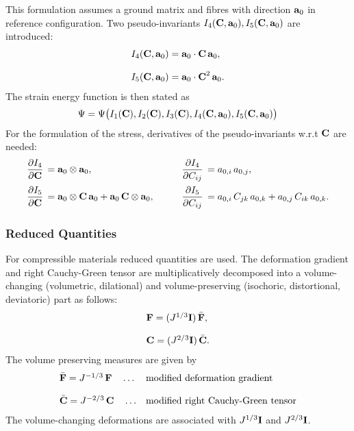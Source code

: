 This formulation assumes a ground matrix and fibres with direction $\textbf{a}_0$ in reference configuration. Two pseudo-invariants $I_4(\textbf{C}, \textbf{a}_0), I_5(\textbf{C}, \textbf{a}_0)$ are introduced:
\begin{equation*}
  \begin{array}{lll}
    I_4(\textbf{C}, \textbf{a}_0) = \textbf{a}_0\cdot \textbf{C}\,\textbf{a}_0,\\[4mm]
    I_5(\textbf{C}, \textbf{a}_0) = \textbf{a}_0\cdot\textbf{C}^2\,\textbf{a}_0.
  \end{array}
\end{equation*}
The strain energy function is then stated as
\begin{equation*}
  \begin{array}{lll}
    \Psi = \Psi\big(I_1(\textbf{C}), I_2(\textbf{C}), I_3(\textbf{C}), I_4(\textbf{C}, \textbf{a}_0), I_5(\textbf{C}, \textbf{a}_0)\big)
  \end{array}
\end{equation*}
For the formulation of the stress, derivatives of the pseudo-invariants w.r.t $\textbf{C}$ are needed:
\begin{equation*}
  \begin{array}{lll}
    \p{I_4}{\bfC} = \bfa_0 \otimes \bfa_0, \qquad & \p{I_4}{C_{ij}} = a_{0,i}\,a_{0,j},\\[4mm]
    \p{I_5}{\bfC} = \bfa_0 \otimes \bfC\,\bfa_0 + \bfa_0\,\bfC \dyad \bfa_0, \qquad &\p{I_5}{C_{ij}} = a_{0,i}\,C_{jk}\,a_{0,k} + a_{0,j}\,C_{ik}\,a_{0,k}.
  \end{array}
\end{equation*}

\subsubsection{Reduced Quantities}

For compressible materials reduced quantities are used. The deformation gradient and right Cauchy-Green tensor are multiplicatively decomposed into a volume-changing (volumetric, dilational) and volume-preserving (isochoric, distortional, deviatoric) part as follows:
\begin{equation*}
  \begin{array}{lll}
    \textbf{F} = (J^{1/3}\textbf{I})\,\bar{\textbf{F}},\\[4mm]
    \textbf{C} = (J^{2/3}\textbf{I})\,\bar{\textbf{C}}.
  \end{array}
\end{equation*}
The volume preserving measures are given by
\begin{equation*}
  \begin{array}{lll}
    \bar{\textbf{F}} = J^{-1/3}\,\textbf{F} \quad \dots &\text{modified deformation gradient}\\[4mm]
    \bar{\textbf{C}} = J^{-2/3}\,\textbf{C} \quad \dots& \text{modified right Cauchy-Green tensor}
  \end{array}
\end{equation*}
The volume-changing deformations are associated with $J^{1/3}\textbf{I}$ and $J^{2/3}\textbf{I}$.

